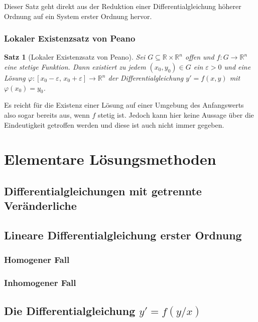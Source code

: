 \documentclass[a4paper, 11pt, accentcolor = tud3b]{tudreport}
\newtheorem{theorem}{Satz}[chapter]
\newcommand{\R}{\mathbb{R}}
\begin{document}
				Dieser Satz geht direkt aus der Reduktion einer Differentialgleichung höherer Ordnung auf ein System erster Ordnung hervor.

			\subsection{Lokaler Existenzsatz von Peano}
				\begin{theorem}[Lokaler Existenzsatz von Peano]
					Sei \( G \subseteq \R \times \R^n \) offen und \( f : G \to \R^n \) eine stetige Funktion. Dann existiert zu jedem \( (x_0, y_0) \in G \) ein \( \varepsilon > 0 \) und eine Lösung \( \varphi : [x_0 - \varepsilon,\, x_0 + \varepsilon] \to \R^n \) der Differentialgleichung \( y' = f(x, y) \) mit \( \varphi(x_0) = y_0 \).
				\end{theorem}
			
				Es reicht für die Existenz einer Lösung auf einer Umgebung des Anfangswerts also sogar bereits aus, wenn \(f\) stetig ist. Jedoch kann hier keine Aussage über die Eindeutigkeit getroffen werden und diese ist auch nicht immer gegeben.

	\chapter{Elementare Lösungsmethoden} %

		\section{Differentialgleichungen mit getrennte Veränderliche} %

		\section{Lineare Differentialgleichung erster Ordnung} %

			\subsection{Homogener Fall} %

			\subsection{Inhomogener Fall} %

		\section{Die Differentialgleichung \( y' = f(y / x) \)} %
\end{document}
